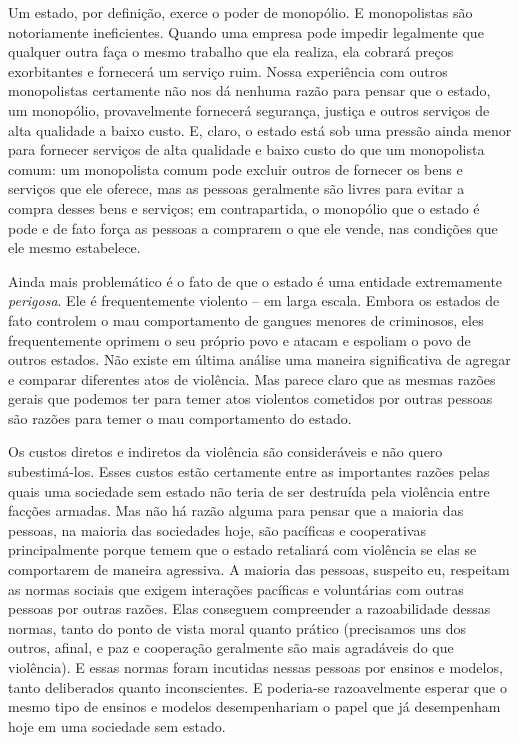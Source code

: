 Um estado, por definição, exerce o poder de monopólio. E monopolistas são notoriamente ineficientes. Quando uma empresa pode impedir legalmente que qualquer outra faça o mesmo trabalho que ela realiza, ela cobrará preços exorbitantes e fornecerá um serviço ruim. Nossa experiência com outros monopolistas certamente não nos dá nenhuma razão para pensar que o estado, um monopólio, provavelmente fornecerá segurança, justiça e outros serviços de alta qualidade a baixo custo. E, claro, o estado está sob uma pressão ainda menor para fornecer serviços de alta qualidade e baixo custo do que um monopolista comum: um monopolista comum pode excluir outros de fornecer os bens e serviços que ele oferece, mas as pessoas geralmente são livres para evitar a compra desses bens e serviços; em contrapartida, o monopólio que o estado é pode e de fato força as pessoas a comprarem o que ele vende, nas condições que ele mesmo estabelece.

Ainda mais problemático é o fato de que o estado é uma entidade extremamente \emph{perigosa}. Ele é frequentemente violento -- em larga escala. Embora os estados de fato controlem o mau comportamento de gangues menores de criminosos, eles frequentemente oprimem o seu próprio povo e atacam e espoliam o povo de outros estados. Não existe em última análise uma maneira significativa de agregar e comparar diferentes atos de violência. Mas parece claro que as mesmas razões gerais que podemos ter para temer atos violentos cometidos por outras pessoas são razões para temer o mau comportamento do estado.

Os custos diretos e indiretos da violência são consideráveis e não quero subestimá-los. Esses custos estão certamente entre as importantes razões pelas quais uma sociedade sem estado não teria de ser destruída pela violência entre facções armadas. Mas não há razão alguma para pensar que a maioria das pessoas, na maioria das sociedades hoje, são pacíficas e cooperativas principalmente porque temem que o estado retaliará com violência se elas se comportarem de maneira agressiva. A maioria das pessoas, suspeito eu, respeitam as normas sociais que exigem interações pacíficas e voluntárias com outras pessoas por outras razões. Elas conseguem compreender a razoabilidade dessas normas, tanto do ponto de vista moral quanto prático (precisamos uns dos outros, afinal, e paz e cooperação geralmente são mais agradáveis do que violência). E essas normas foram incutidas nessas pessoas por ensinos e modelos, tanto deliberados quanto inconscientes. E poderia-se razoavelmente esperar que o mesmo tipo de ensinos e modelos desempenhariam o papel que já desempenham hoje em uma sociedade sem estado.

